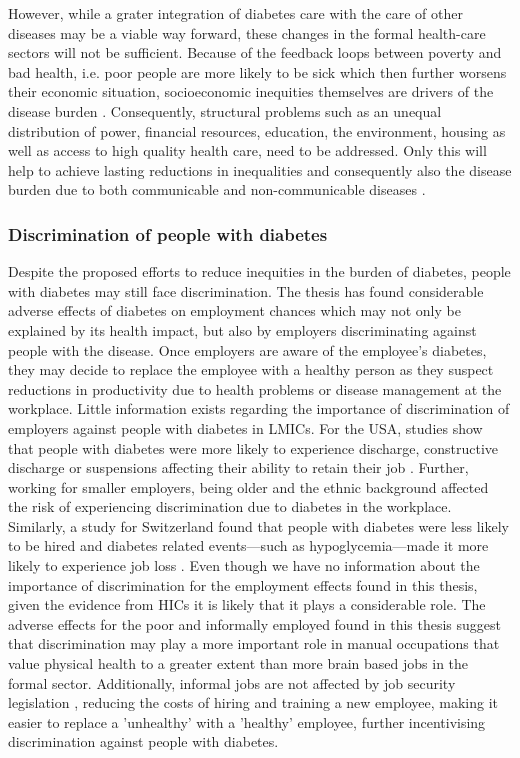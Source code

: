 However, while a grater integration of diabetes care with the care of other diseases may be a viable way forward, these changes in the formal health-care sectors will not be sufficient. Because of the feedback loops between poverty and bad health, i.e. poor people are more likely to be sick which then further worsens their economic situation, socioeconomic inequities themselves are drivers of the disease burden \parencite{DiCesare2013}. Consequently, structural problems such as an unequal distribution of power, financial resources, education, the environment, housing as well as access to high quality health care,  need to be addressed. Only this will help to achieve lasting reductions in inequalities and consequently also the disease burden due to both communicable and non-communicable diseases \parencite{DiCesare2013}.

\subsubsection{Discrimination of people with diabetes}

Despite the proposed efforts to reduce inequities in the burden of diabetes, people with diabetes may still face discrimination. The thesis has found considerable adverse effects of diabetes on employment chances which may not only be explained by its health impact, but also by employers discriminating against people with the disease. Once employers are aware of the employee's diabetes, they may decide to replace the employee with a healthy person as they suspect reductions in productivity due to health problems or disease management at the workplace. Little information exists regarding the importance of discrimination of employers against people with diabetes in \acp{LMIC}. For the USA, studies show that people with diabetes were more likely to experience discharge, constructive discharge or suspensions affecting their ability to retain their job \parencite{McMahon2005}. Further, working for smaller employers, being older and the ethnic background affected the risk of experiencing discrimination due to diabetes in the workplace. Similarly, a study for Switzerland found that people with diabetes were less likely to be hired and diabetes related events---such as hypoglycemia---made it more likely to experience job loss \parencite{Nebiker-Pedrotti2009}. Even though we have no information about the importance of discrimination for the employment effects found in this thesis, given the evidence from \acp{HIC} it is likely that it plays a considerable role. The adverse effects for the poor and informally employed found in this thesis suggest that discrimination may play a more important role in manual occupations that value physical health to a greater extent than more brain based jobs in the formal sector. Additionally, informal jobs are not affected by job security legislation \parencite{Ulyssea2010,Loayza2011}, reducing the costs of hiring and training a new employee, making it easier to replace a 'unhealthy' with a 'healthy' employee, further incentivising discrimination against people with diabetes.

